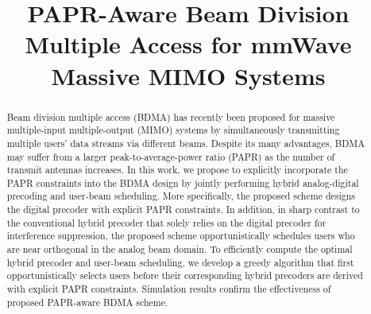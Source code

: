 \documentclass[conference]{IEEEtran}
\begin{document}
\title{PAPR-Aware Beam Division Multiple Access for mmWave Massive MIMO Systems}
\author{}


\maketitle \thispagestyle{plain}

\begin{abstract}
Beam division multiple access (BDMA) has recently been proposed for massive multiple-input multiple-output (MIMO) systems by simultaneously transmitting multiple users' data streams via different beams. Despite its many advantages, BDMA may suffer from a larger peak-to-average-power ratio (PAPR) as the number of transmit antennas increases. In this work, we propose to explicitly incorporate the PAPR constraints into the BDMA design by jointly performing hybrid analog-digital precoding and user-beam scheduling. More specifically, the proposed scheme designs the digital precoder with explicit PAPR constraints. In addition, in sharp contrast to the conventional hybrid precoder that solely relies on the digital precoder for interference suppression, the proposed scheme opportunistically schedules users who are near orthogonal in the analog beam domain. To efficiently compute the optimal hybrid precoder and user-beam scheduling, we develop a greedy algorithm that first opportunistically selects users before their corresponding hybrid precoders are derived with explicit PAPR constraints. Simulation results confirm the effectiveness of proposed PAPR-aware BDMA scheme.
\end{abstract}
\end{document}
